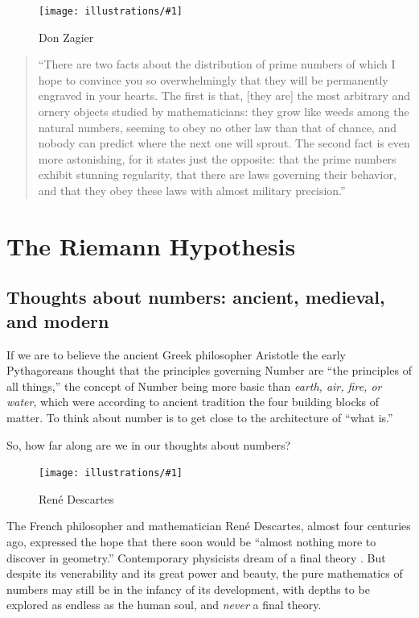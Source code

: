 \documentclass[openany]{book}
\newcommand{\ill}[3]{%
   \begin{figure}[H]%
   \vspace{-2ex}
   \centering%
   \texttt{[image: illustrations/\#1]}%
   \caption{#3}%
   \vspace{-2ex}
    \end{figure}}
\theoremstyle{plain}
\theoremstyle{definition}
\newcommand{\RH}{Riemann Hypothesis\index{Riemann Hypothesis}}
\begin{document}
\ill{zagier}{.25}{Don Zagier}
                   
                   
\begin{quote}                      
  ``There are two facts about the distribution of prime numbers of
  which I hope to convince you so overwhelmingly that they will be
  permanently engraved in your hearts. The first is that, [they are]
  the most arbitrary and ornery objects studied by mathematicians:
  they grow like weeds among the natural numbers, seeming to obey no
  other law than that of chance, and nobody can predict where the next
  one will sprout. The second fact is even more astonishing, for it
  states just the opposite: that the prime numbers exhibit stunning
  regularity, that there are laws governing their behavior, and that
  they obey these laws with almost military precision.''
\end{quote}


\part{The \RH{}\label{part1}}

 
\chapter[Thoughts about numbers]{Thoughts about numbers: ancient, medieval, and modern}

If we are to believe the ancient Greek philosopher Aristotle the early
Pythagoreans thought that the principles governing Number are ``the
principles of all things,'' the concept of Number being more basic than
{\em earth, air, fire, or water}, which were according to ancient tradition
the four building blocks of matter. To think about number is to get
close to the architecture of ``what is.''

So, how far along are we in our thoughts about numbers?


\ill{descartes}{.25}{Ren\'e Descartes}

The French philosopher and mathematician Ren\'e Descartes, almost four
centuries ago, expressed the hope that there soon would be ``almost
nothing more to discover in geometry.'' Contemporary physicists dream
of a final theory .  But despite its
venerability and its great power and beauty, the pure mathematics of
numbers may still be in the infancy of its development, with depths to
be explored as endless as the human soul, and {\it never} a final theory.
\end{document}
